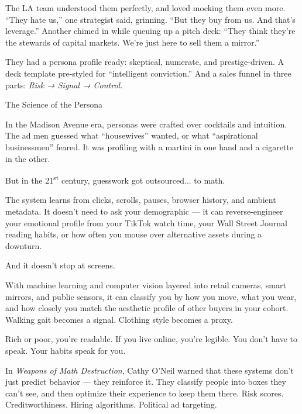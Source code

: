 The LA team understood them perfectly, and loved mocking them even more.
``They hate us,'' one strategist said, grinning. ``But they buy from us. And that’s leverage.''
Another chimed in while queuing up a pitch deck:
``They think they’re the stewards of capital markets. We’re just here to sell them a mirror.''

They had a persona profile ready: skeptical, numerate, and prestige-driven.
A deck template pre-styled for ``intelligent conviction.''
And a sales funnel in three parts:
\textit{Risk → Signal → Control.}

\medskip

\begin{HistoricalSidebar}{The Science of the Persona}

  In the Madison Avenue era, personas were crafted over cocktails and intuition.  
  The ad men guessed what “housewives” wanted, or what “aspirational businessmen” feared.  
  It was profiling with a martini in one hand and a cigarette in the other.

  \medskip
  
  But in the 21\textsuperscript{st} century, guesswork got outsourced... to math.
  
  \medskip
  
  The system learns from clicks, scrolls, pauses, browser history, and ambient metadata.  
  It doesn’t need to ask your demographic — it can reverse-engineer your emotional profile from your TikTok watch time,  
  your Wall Street Journal reading habits, or how often you mouse over alternative assets during a downturn.

  \medskip
  
  And it doesn’t stop at screens.

  \medskip
  
  With machine learning and computer vision layered into retail cameras, smart mirrors, and public sensors,  
  it can classify you by how you move, what you wear, and how closely you match the aesthetic profile of other buyers 
  in your cohort.  
  Walking gait becomes a signal. Clothing style becomes a proxy.

  \medskip
  
  Rich or poor, you’re readable.  
  If you live online, you’re legible.  
  You don’t have to speak. Your habits speak for you.
  
  \medskip
  
  In \textit{Weapons of Math Destruction}, Cathy O’Neil warned that these systems don’t just predict behavior —  
  they reinforce it. They classify people into boxes they can’t see, and then optimize their experience  
  to keep them there. Risk scores. Creditworthiness. Hiring algorithms. Political ad targeting.
  

\end{HistoricalSidebar}
